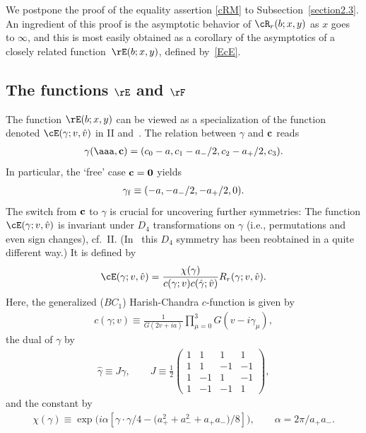 We postpone the proof of the equality assertion \eqref{cRM} to Subsection~\ref{section2.3}. An ingredient of this proof is the asymptotic behavior of $\cR_r(b;x,y)$ as $x$ goes to $\infty$, and this is most easily obtained as a corollary of the asymptotics of a closely related function~$\rE(b;x,y)$, def\/ined by~\eqref{EcE}.

\subsection[The functions $\rE$ and $\rF$]{The functions $\boldsymbol{\rE}$ and $\boldsymbol{\rF}$}\label{section2.2}

The function $\rE(b;x,y)$ can be viewed as a specialization of the function denoted $\cE(\gamma;v,\hat{v})$ in II and~\cite{Rsurv}. The relation between $\gamma$ and ${\bf c}$ reads
\begin{gather}\label{gamc}
\gamma(\aaa,{\bf c})=(c_0-a,c_1-a_{-}/2,c_2-a_{+}/2,c_3).
\end{gather}
In particular, the `free' case ${\bf c}={\bf 0}$ yields
\begin{gather}\label{gamf}
\gamma_{\rm f}\equiv (-a,-a_{-}/2,-a_{+}/2,0).
\end{gather}
The switch from ${\bf c}$ to $\gamma$ is crucial for uncovering further symmetries: The function $\cE(\gamma;v,\hat{v})$ is invariant under $D_4$ transformations on $\gamma$ (i.e., permutations and even sign changes), cf.~II. (In~\cite{bust} this $D_4$ symmetry has been reobtained in a quite dif\/ferent way.) It is def\/ined by
\begin{gather}
\cE(\gamma;v,\hat{v})=\frac{\chi(\gamma)}{c(\gamma;v)c(\hat{\gamma};\hat{v})}R_r(\gamma;v,\hat{v}).
\end{gather}
Here, the generalized ($BC_1$) Harish-Chandra $c$-function is given by
\begin{gather}\label{c}
c(\gamma;v)\equiv \frac{1}{G(2v+ia)}\prod_{\mu =0}^3G(v-i\gamma_{\mu}),
\end{gather}
the dual of $\gamma$ by
\begin{gather}\label{dualgam}
\hat{\gamma}\equiv J\gamma,\qquad
J\equiv \frac{1}{2} \left( \begin{array}{rrrr}
1  &  1  &  1  &  1  \\
1  &  1  &  -1  &  -1  \\
1  &  -1  &  1  &  -1  \\
1  &  -1  &  -1  &  1
\end{array} \right) ,
\end{gather}
and the constant by
\begin{gather}\label{chigam}
\chi(\gamma) \equiv \exp\big(i\alpha [\gamma\cdot \gamma /4-\big(a_{+}^2+a_{-}^2+a_{+}a_{-}\big)/8]\big),\qquad
\alpha =2\pi/a_{+}a_{-}.
\end{gather}

